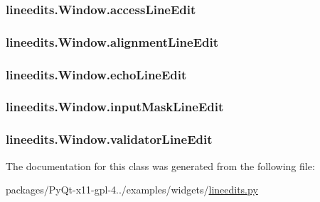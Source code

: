 \subsubsection[{access\+Line\+Edit}]{\setlength{\rightskip}{0pt plus 5cm}lineedits.\+Window.\+access\+Line\+Edit}\label{classlineedits_1_1Window_a8073ad746208fb1e680431ef219fe542}
\hypertarget{classlineedits_1_1Window_ad49e2ddc88889922ce4331ef46754a7e}{}
\subsubsection[{alignment\+Line\+Edit}]{\setlength{\rightskip}{0pt plus 5cm}lineedits.\+Window.\+alignment\+Line\+Edit}\label{classlineedits_1_1Window_ad49e2ddc88889922ce4331ef46754a7e}
\hypertarget{classlineedits_1_1Window_af062bae3c049b3a761482052dbd57d8c}{}
\subsubsection[{echo\+Line\+Edit}]{\setlength{\rightskip}{0pt plus 5cm}lineedits.\+Window.\+echo\+Line\+Edit}\label{classlineedits_1_1Window_af062bae3c049b3a761482052dbd57d8c}
\hypertarget{classlineedits_1_1Window_aebab66696906007f35998963574ec928}{}
\subsubsection[{input\+Mask\+Line\+Edit}]{\setlength{\rightskip}{0pt plus 5cm}lineedits.\+Window.\+input\+Mask\+Line\+Edit}\label{classlineedits_1_1Window_aebab66696906007f35998963574ec928}
\hypertarget{classlineedits_1_1Window_ac529e77541388259c8109483a302c66a}{}
\subsubsection[{validator\+Line\+Edit}]{\setlength{\rightskip}{0pt plus 5cm}lineedits.\+Window.\+validator\+Line\+Edit}\label{classlineedits_1_1Window_ac529e77541388259c8109483a302c66a}


The documentation for this class was generated from the following file\+:\begin{DoxyCompactItemize}
\item 
packages/\+Py\+Qt-\/x11-\/gpl-\/4../examples/widgets/\hyperlink{lineedits_8py}{lineedits.\+py}\end{DoxyCompactItemize}
